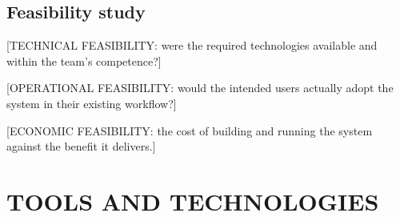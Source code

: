 \subsection{Feasibility study}
\label{subsec:feasibility}

[TECHNICAL FEASIBILITY: were the required technologies available and
within the team's competence?]

[OPERATIONAL FEASIBILITY: would the intended users actually adopt the
system in their existing workflow?]

[ECONOMIC FEASIBILITY: the cost of building and running the system
against the benefit it delivers.]

\section{TOOLS AND TECHNOLOGIES}
\label{sec:tools}

